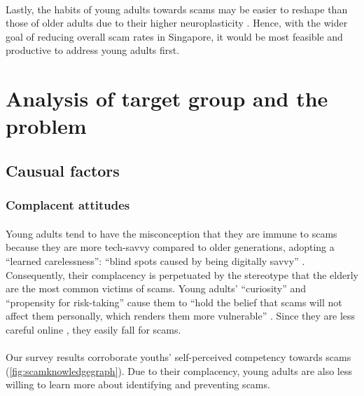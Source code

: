 \message{ !name(written-report.tex)}\documentclass[a4paper]{article}
\begin{document}
\paragraph{} Lastly, the habits of young adults towards scams may be easier to
reshape than those of older adults due to their higher neuroplasticity
\parencite{GoodTherapy.2019}. Hence, with the wider goal of reducing overall
scam rates in Singapore, it would be most feasible and productive to address
young adults first.

\section{Analysis of target group and the problem}
\subsection{Causual factors}
\subsubsection{Complacent attitudes}
\paragraph{} Young adults tend to have the misconception that they are immune to
scams because they are more tech-savvy compared to older generations, adopting a
“learned carelessness”: “blind spots caused by being digitally savvy”
\parencite{Yuan.2023}. Consequently, their complacency is perpetuated by the
stereotype that the elderly are the most common victims of scams. Young adults’
“curiosity” and “propensity for risk-taking” cause them to “hold the belief that
scams will not affect them personally, which renders them more vulnerable”
\parencite{Cheung.2023}. Since they are less careful online
\parencite{Carlson.2022}, they easily fall for scams.

\paragraph{} Our survey results corroborate youths’ self-perceived competency
towards scams (\cref{fig:scamknowledgegraph}). Due to their complacency, young
adults are also less willing to learn more about identifying and preventing
scams.
\end{document}
